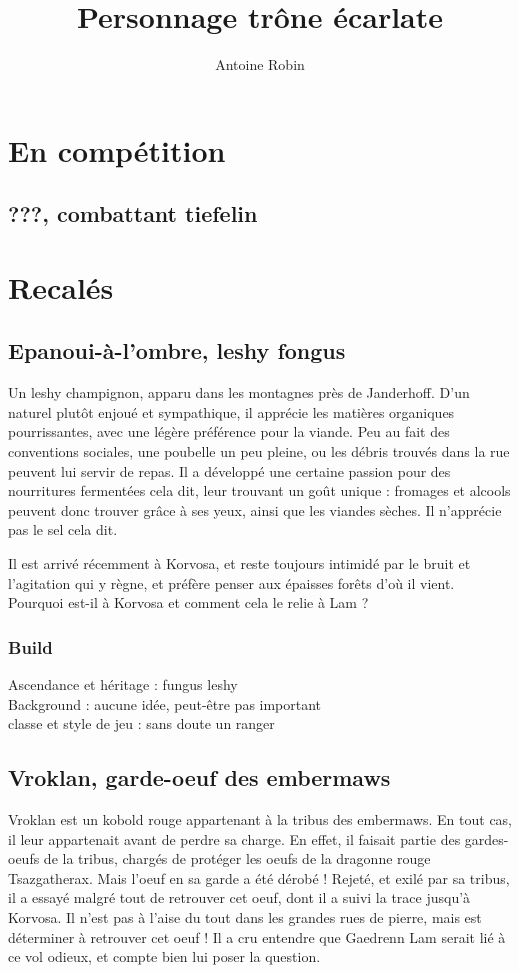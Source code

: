 \documentclass[10pt,a4paper]{book}
\author{ Antoine Robin}
\title{Personnage trône écarlate}
\begin{document}
\chapter{En compétition}
\section{???, combattant tiefelin}

\chapter{Recalés}
\section{Epanoui-à-l'ombre, leshy fongus}
Un leshy champignon, apparu dans les montagnes près de Janderhoff. D'un naturel plutôt enjoué et sympathique, il apprécie les matières organiques pourrissantes, avec une légère préférence pour la viande. Peu au fait des conventions sociales, une poubelle un peu pleine, ou les débris trouvés dans la rue peuvent lui servir de repas. Il a développé une certaine passion pour des nourritures fermentées cela dit, leur trouvant un goût unique : fromages et alcools peuvent donc trouver grâce à ses yeux, ainsi que les viandes sèches. Il n'apprécie pas le sel cela dit.

Il est arrivé récemment à Korvosa, et reste toujours intimidé par le bruit et l'agitation qui y règne, et préfère penser aux épaisses forêts d'où il vient. Pourquoi est-il à Korvosa et comment cela le relie à Lam ?

\subsection{Build}
Ascendance et héritage : fungus leshy \\
Background : aucune idée, peut-être pas important \\
classe et style de jeu : sans doute un ranger

\section{Vroklan, garde-oeuf des embermaws}
Vroklan est un kobold rouge appartenant à la tribus des embermaws. En tout cas, il leur appartenait avant de perdre sa charge. En effet, il faisait partie des gardes-oeufs de la tribus, chargés de protéger les oeufs de la dragonne rouge Tsazgatherax. Mais l'oeuf en sa garde a été dérobé ! Rejeté, et exilé par sa tribus, il a essayé malgré tout de retrouver cet oeuf, dont il a suivi la trace jusqu'à Korvosa. Il n'est pas à l'aise du tout dans les grandes rues de pierre, mais est déterminer à retrouver cet oeuf ! Il a cru entendre que Gaedrenn Lam serait lié à ce vol odieux, et compte bien lui poser la question.
\end{document}
